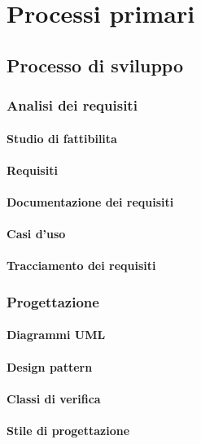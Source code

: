 \section{Processi primari}
\subsection{Processo di sviluppo}

\subsubsection{Analisi dei requisiti}
\paragraph{Studio di fattibilita}
\paragraph{Requisiti}
\paragraph{Documentazione dei requisiti}
\paragraph{Casi d'uso}
\paragraph{Tracciamento dei requisiti}

\subsubsection{Progettazione}
\paragraph{Diagrammi UML}
\paragraph{Design pattern}
\paragraph{Classi di verifica}
\paragraph{Stile di progettazione}

